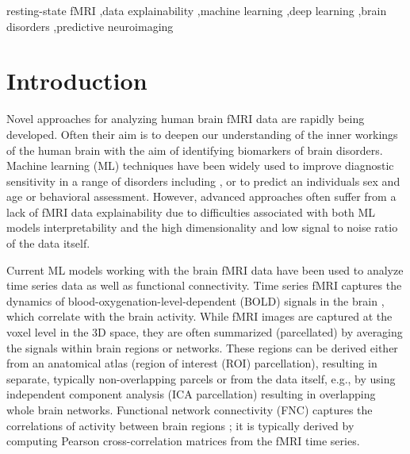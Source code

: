 \documentclass[final,5p,times,twocolumn,authoryear]{elsarticle}
\begin{document}
\begin{frontmatter}
\begin{abstract}
Given the success of straightforward approaches, we challenge the merit of research that concentrates solely on complex model development driven by classification. Instead, we advocate for increased focus on designing models that prioritize the explainability of fMRI data or pursue applicable objectives beyond mere classification accuracy, unless they significantly outperform logistic regression or our proposed model. To validate our claim, we explore possible reasons for the superior performance of our straightforward model by examining the innate characteristics of fMRI time series data. Our findings suggest that the sequential information hidden in the temporal order may be far less important for the accurate fMRI classification than the stand-alone pieces of information scattered across the frames of the time series.
\end{abstract}

\begin{keyword}
resting-state fMRI \sep data explainability \sep machine learning \sep deep learning \sep brain disorders \sep predictive neuroimaging
\end{keyword}

\end{frontmatter}

\section{Introduction}
Novel approaches for analyzing human brain fMRI data are rapidly being developed. Often their aim is to deepen our understanding of the inner workings of the human brain with the aim of identifying biomarkers of brain disorders. Machine learning (ML) techniques have been widely used to improve diagnostic sensitivity in a range of disorders including \citep{autism_rev, depression_rev, schizophrenia_rev, alzheimer_rev}, or to predict an individuals sex and age \citep{age_and_sex} or behavioral assessment. However, advanced approaches often suffer from a lack of fMRI data explainability due to difficulties associated with both ML models interpretability and the high dimensionality and low signal to noise ratio of the data itself.

Current ML models working with the brain fMRI data have been used to analyze time series data as well as functional connectivity. Time series fMRI captures the dynamics of blood-oxygenation-level-dependent (BOLD) signals in the brain \citep{fmri_bold}, which correlate with the brain activity. While fMRI images are captured at the voxel level in the 3D space, they are often summarized (parcellated) by averaging the signals within brain regions or networks. These regions can be derived either from an anatomical atlas \citep{dk, schaefer} (region of interest (ROI) parcellation), resulting in separate, typically non-overlapping parcels or from the data itself, e.g., by using independent component analysis \citep{fu2019} (ICA parcellation) resulting in overlapping whole brain networks. Functional network connectivity (FNC) captures the correlations of activity between brain regions \citep{fnc_overview}; it is typically derived by computing Pearson cross-correlation matrices from the fMRI time series. 
\end{document}
